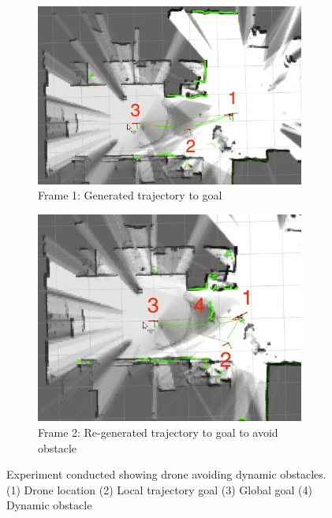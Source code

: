 \documentclass[capstone_report.tex]{subfiles}
\begin{document}
\begin{figure}[H]
    \centering
    \begin{subfigure}{0.5\textwidth}
        \centering
        \includegraphics[width=0.97\textwidth]{./imgs/dynamic_objects/an_frame_1.png}
        \caption{Frame 1: Generated trajectory to goal}
        \label{fig:avoid_obs_1}
    \end{subfigure}%
    \begin{subfigure}{0.5\textwidth}
        \centering
        \includegraphics[width=0.97\textwidth]{./imgs/dynamic_objects/an_frame_2.png}
        \caption{Frame 2: Re-generated trajectory to goal to avoid obstacle}
        \label{fig:avoid_obs_2}
    \end{subfigure}
    \caption{Experiment conducted showing drone avoiding dynamic obstacles.  (1) Drone location (2) Local trajectory goal (3) Global goal (4) Dynamic obstacle\label{fig:avoid_obs}}
\end{figure}
\end{document}
